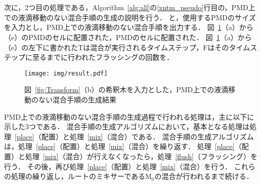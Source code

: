\section{}
次に，2つ目の処理である，Algorithm~\ref{alg:all}の\ref{xntm_pseudo}行目の，PMD上での液滴移動のない混合手順の生成の説明を行う．
と，使用するPMDのサイズを入力とし，PMD上での液滴移動のない混合手順を出力する．
図~\ref{fig:result}（a）から（e）のPMDのセルに配置された，PMDのセルに配置された．
図~\ref{fig:result}（a）から（e）の左下に書かれたTは混合が実行されるタイムステップ，Fはそのタイムステップに至るまでに行われたフラッシングの回数を．

\begin{figure}[tbp]
 \centering\texttt{[image: img/result.pdf]}
    \caption{図~\ref{fig:Transform}（b）の希釈木を入力とした，PMD上での液滴移動のない混合手順の生成結果}\label{fig:result}
\end{figure}



PMD上での液滴移動のない混合手順の生成過程で行われる処理は，主に以下に示した3つである．
混合手順の生成アルゴリズムにおいて，基本となる処理は処理~\ref{place}（配置）と処理~\ref{mix}（混合）である．
混合手順の生成アルゴリズムは，処理~\ref{place}（配置）と処理~\ref{mix}（混合）を繰り返す．
処理~\ref{place}（配置）と処理~\ref{mix}（混合）が行えなくなったら，処理~\ref{flush}（フラッシング）を行う．
その後，再び処理~\ref{place}（配置）と処理~\ref{mix}（混合）を行う．
これらの処理の繰り返し，ルートのミキサーであるM$_0$の混合が行われるまで続ける．

